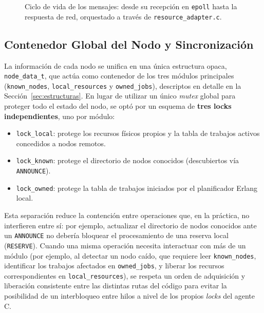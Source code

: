 \documentclass[12pt,a4paper]{article}
\begin{document}
\begin{figure}[H]
\caption{Ciclo de vida de los mensajes: desde su recepción en \texttt{epoll} hasta la respuesta de red, orquestado a través de \texttt{resource\_adapter.c}.}
\end{figure}

\subsection{Contenedor Global del Nodo y Sincronización}

La información de cada nodo se unifica en una única estructura opaca, \texttt{node\_data\_t}, que actúa como contenedor de los tres módulos principales (\texttt{known\_nodes}, \texttt{local\_resources} y \texttt{owned\_jobs}), descriptos en detalle en la Sección~\ref{sec:estructuras}. En lugar de utilizar un único \emph{mutex} global para proteger todo el estado del nodo, se optó por un esquema de \textbf{tres locks independientes}, uno por módulo:

\begin{itemize}
    \item \texttt{lock\_local}: protege los recursos físicos propios y la tabla de trabajos activos concedidos a nodos remotos.
    \item \texttt{lock\_known}: protege el directorio de nodos conocidos (descubiertos vía \texttt{ANNOUNCE}).
    \item \texttt{lock\_owned}: protege la tabla de trabajos iniciados por el planificador Erlang local.
\end{itemize}

Esta separación reduce la contención entre operaciones que, en la práctica, no interfieren entre sí: por ejemplo, actualizar el directorio de nodos conocidos ante un \texttt{ANNOUNCE} no debería bloquear el procesamiento de una reserva local (\texttt{RESERVE}). Cuando una misma operación necesita interactuar con más de un módulo (por ejemplo, al detectar un nodo caído, que requiere leer \texttt{known\_nodes}, identificar los trabajos afectados en \texttt{owned\_jobs}, y liberar los recursos correspondientes en \texttt{local\_resources}), se respeta un orden de adquisición y liberación consistente entre las distintas rutas del código para evitar la posibilidad de un interbloqueo entre hilos a nivel de los propios \emph{locks} del agente C.
\end{document}
